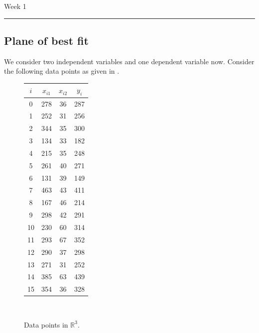 \documentclass[a4paper, 12pt]{article}
\numberwithin{equation}{section}
\numberwithin{figure}{section}
\theoremstyle{definition}
\newcommand{\R}{\mathbb{R}}
\newcommand{\WEEK}[1]{%
\hfill Week #1

\vspace{-1em}

\begin{center}
	\rule{\textwidth}{2pt}
\end{center}
\vspace{0.5em}%
}
\begin{document}
\WEEK{1}


\subsection{Plane of best fit}

We consider two independent variables and one dependent variable now. Consider
the following data points as given in .

\begin{figure}[h]
	\centering
	\begin{minipage}{0.3\textwidth}
		\centering 
		\begin{tabular}{cccc}
			$i$ & $x_{i1}$ & $x_{i2}$ & $y_i$ \\ \hline
			0 & 278 & 36 & 287 \\
			1 & 252 & 31 & 256 \\
			2 & 344 & 35 & 300 \\
			3 & 134 & 33 & 182 \\
			4 & 215 & 35 & 248 \\
			5 & 261 & 40 & 271 \\
			6 & 131 & 39 & 149 \\
			7 & 463 & 43 & 411 \\
			8 & 167 & 46 & 214 \\
			9 & 298 & 42 & 291 \\
			10 & 230 & 60 & 314 \\
			11 & 293 & 67 & 352 \\
			12 & 290 & 37 & 298 \\
			13 & 271 & 31 & 252 \\
			14 & 385 & 63 & 439 \\
			15 & 354 & 36 & 328
		\end{tabular}
	\end{minipage}~%
	\begin{minipage}{0.6\textwidth}
	\end{minipage}	
	\caption{Data points in $\R^3$.}
	\label{fig:3d-data-points}
\end{figure}
\end{document}
